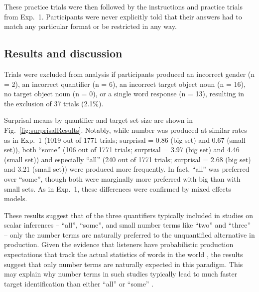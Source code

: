 \documentclass[10pt,letterpaper]{article}
\newcommand{\figref}[1]{Fig.~\ref{#1}}
\begin{document}


These practice trials were then followed by the instructions and practice trials from Exp.~1. %
Participants were never explicitly told that their answers had to match any particular format or be restricted in any way. 

\subsection{Results and discussion}

Trials were excluded from analysis if participants produced  an incorrect gender (n = 2), an incorrect quantifier (n = 6), an incorrect target object noun (n = 16), no target object noun (n = 0), or a single word response (n = 13), resulting in the exclusion of 37 trials (2.1\%). 

Surprisal means by quantifier and target set size are shown in \figref{fig:surprisalResults}. Notably, while number was produced at similar rates as in Exp.~1 (1019 out of 1771 trials; surprisal = 0.86 (big set) and 0.67 (small set)), both ``some'' (106 out of 1771 trials; surprisal = 3.97 (big set) and 4.46 (small set)) and especially ``all'' (240 out of 1771 trials; surprisal = 2.68 (big set) and 3.21 (small set)) were produced more frequently. In fact, ``all'' was preferred over ``some'', though both were marginally more preferred with big than with small sets. As in Exp.~1, these differences were confirmed by mixed effects models. 

These results suggest that of the three quantifiers typically included in studies on scalar inferences -- ``all'', ``some'', and small number terms  like ``two'' and ``three'' -- only the number terms are naturally preferred to the unquantified alternative in production. Given the evidence that listeners have probabilistic  production expectations that  track the actual statistics of words in the world  \cite{levy2008, frank2013word}, the results suggest that only number terms are naturally expected in this paradigm. This may explain why number terms in such studies typically lead to  much faster target identification than either ``all'' or ``some'' \cite{huang2009,DegenT2016,sun2020}. 
\end{document}
